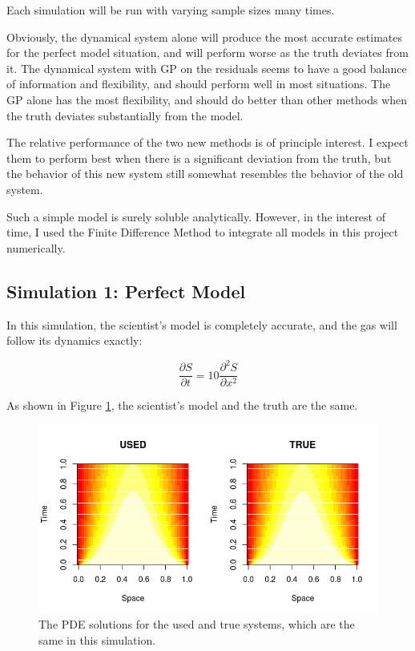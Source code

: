 \documentclass{article}
\begin{document}
	Each simulation will be run with varying sample sizes many times.
	
	Obviously, the dynamical system alone will produce the most accurate estimates for the perfect model situation, and will perform worse as the truth deviates from it. The dynamical system with GP on the residuals seems to have a good balance of information and flexibility, and should perform well in most situations. The GP alone has the most flexibility, and should do better than other methods when the truth deviates substantially from the model. 
	
	The relative performance of the two new methods is of principle interest. I expect them to perform best when there is a significant deviation from the truth, but the behavior of this new system still somewhat resembles the behavior of the old system.
	
	Such a simple model is surely soluble analytically. However, in the interest of time, I used the Finite Difference Method to integrate all models in this project numerically.
	
	\subsection{Simulation 1: Perfect Model}
	
	In this simulation, the scientist's model is completely accurate, and the gas will follow its dynamics exactly:
	
	$$\frac{\partial S}{\partial t} = 10 \frac{\partial^2 S}{\partial x^2}$$
	
	 As shown in Figure \ref{fig2}, the scientist's model and the truth are the same.
	
	
	\begin{figure}[H]
		\includegraphics[scale=0.7]{FinalImage2.png}
		\caption{The PDE solutions for the used and true systems, which are the same in this simulation.}
		\label{fig2}
	\end{figure}
	
\end{document}
